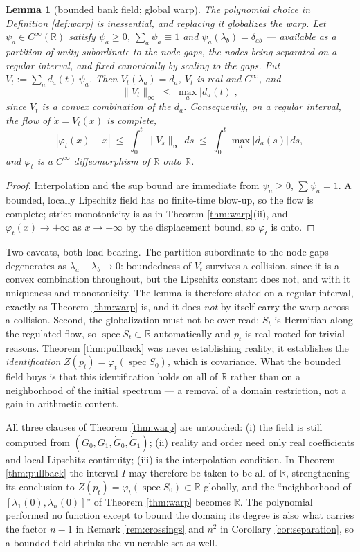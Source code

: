 \documentclass[11pt]{article}
\theoremstyle{plain}
\newtheorem{lemma}[theorem]{Lemma}
\theoremstyle{definition}
\theoremstyle{remark}
\newcommand{\R}{\mathbb{R}}
\DeclareMathOperator{\spec}{spec}
\begin{document}
\begin{lemma}[bounded bank field; global warp]\label{lem:boundedfield}
The polynomial choice in Definition \ref{def:warp} is inessential, and replacing
it globalizes the warp. Let $\psi_a\in C^\infty(\R)$ satisfy $\psi_a\ge0$,
$\sum_a\psi_a\equiv1$ and $\psi_a(\lambda_b)=\delta_{ab}$ --- available as a
partition of unity subordinate to the node gaps, the nodes being separated on a
regular interval, and fixed canonically by scaling to the gaps. Put
$V_t:=\sum_a d_a(t)\,\psi_a$. Then $V_t(\lambda_a)=d_a$, $V_t$ is real and
$C^\infty$, and
\[
  \|V_t\|_\infty \;\le\; \max_a|d_a(t)| ,
\]
since $V_t$ is a convex combination of the $d_a$. Consequently, \emph{on a regular interval}, the flow of $\dot x=V_t(x)$ is
complete,
\[
  |\varphi_t(x)-x|\;\le\;\int_0^t\|V_s\|_\infty\,ds
  \;\le\;\int_0^t\max_a|d_a(s)|\,ds ,
\]
and $\varphi_t$ is a $C^\infty$ diffeomorphism of $\R$ \emph{onto} $\R$.
\end{lemma}

\begin{proof}
Interpolation and the sup bound are immediate from $\psi_a\ge0$,
$\sum\psi_a=1$. A bounded, locally Lipschitz field has no finite-time
blow-up, so the flow is complete; strict monotonicity is as in Theorem
\ref{thm:warp}(ii), and $\varphi_t(x)\to\pm\infty$ as $x\to\pm\infty$ by the
displacement bound, so $\varphi_t$ is onto.
\end{proof}

\noindent Two caveats, both load-bearing. The partition subordinate to the
node gaps degenerates as $\lambda_a-\lambda_b\to0$: boundedness of $V_t$
survives a collision, since it is a convex combination throughout, but the
Lipschitz constant does not, and with it uniqueness and monotonicity. The
lemma is therefore stated on a regular interval, exactly as Theorem
\ref{thm:warp} is, and it does \emph{not} by itself carry the warp across a
collision. Second, the globalization must not be over-read: $S_t$ is
Hermitian along the regulated flow, so $\spec S_t\subset\R$ automatically and
$p_t$ is real-rooted for trivial reasons. Theorem \ref{thm:pullback} was never
establishing reality; it establishes the \emph{identification}
$Z(p_t)=\varphi_t(\spec S_0)$, which is covariance. What the bounded field buys
is that this identification holds on all of $\R$ rather than on a neighborhood
of the initial spectrum --- a removal of a domain restriction, not a gain in
arithmetic content.

\noindent All three clauses of Theorem \ref{thm:warp} are untouched: (i) the
field is still computed from $(G_0,G_1,\dot G_0,\dot G_1)$; (ii) reality and
order need only real coefficients and local Lipschitz continuity; (iii) is the
interpolation condition. In Theorem \ref{thm:pullback} the interval $I$ may
therefore be taken to be all of $\R$, strengthening its conclusion to
$Z(p_t)=\varphi_t(\spec S_0)\subset\R$ globally, and the ``neighborhood of
$[\lambda_1(0),\lambda_n(0)]$'' of Theorem \ref{thm:warp} becomes $\R$. The
polynomial performed no function except to bound the domain; its degree is also
what carries the factor $n-1$ in Remark \ref{rem:crossings} and $n^2$ in
Corollary \ref{cor:separation}, so a bounded field shrinks the vulnerable set
as well.
\end{document}
